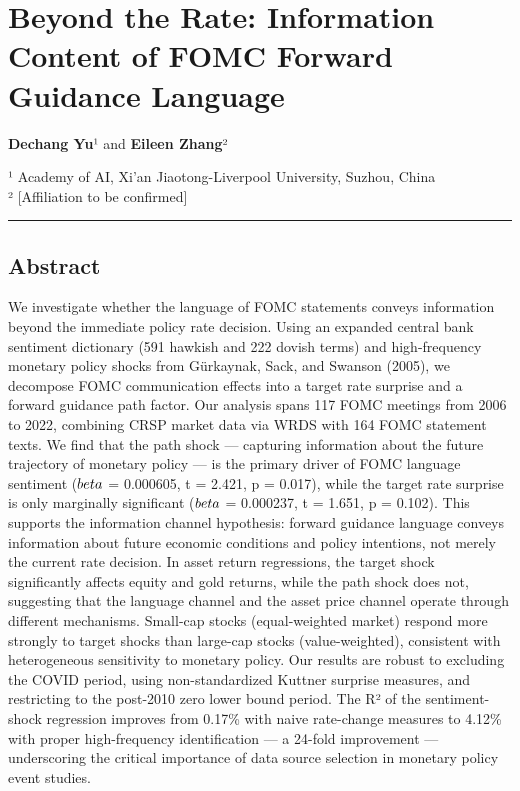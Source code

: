 \documentclass[12pt]{article}
\begin{document}
\section{Beyond the Rate: Information Content of FOMC Forward Guidance
Language}\label{beyond-the-rate-information-content-of-fomc-forward-guidance-language}

\textbf{Dechang Yu}¹ and \textbf{Eileen Zhang}²

¹ Academy of AI, Xi'an Jiaotong-Liverpool University, Suzhou, China\\
² {[}Affiliation to be confirmed{]}

\begin{center}\rule{0.5\linewidth}{0.5pt}\end{center}

\subsection{Abstract}\label{abstract}

We investigate whether the language of FOMC statements conveys
information beyond the immediate policy rate decision. Using an expanded
central bank sentiment dictionary (591 hawkish and 222 dovish terms) and
high-frequency monetary policy shocks from Gürkaynak, Sack, and Swanson
(2005), we decompose FOMC communication effects into a target rate
surprise and a forward guidance path factor. Our analysis spans 117 FOMC
meetings from 2006 to 2022, combining CRSP market data via WRDS with 164
FOMC statement texts. We find that the path shock --- capturing
information about the future trajectory of monetary policy --- is the
primary driver of FOMC language sentiment (\(\\beta\) = 0.000605, t =
2.421, p = 0.017), while the target rate surprise is only marginally
significant (\(\\beta\) = 0.000237, t = 1.651, p = 0.102). This supports
the information channel hypothesis: forward guidance language conveys
information about future economic conditions and policy intentions, not
merely the current rate decision. In asset return regressions, the
target shock significantly affects equity and gold returns, while the
path shock does not, suggesting that the language channel and the asset
price channel operate through different mechanisms. Small-cap stocks
(equal-weighted market) respond more strongly to target shocks than
large-cap stocks (value-weighted), consistent with heterogeneous
sensitivity to monetary policy. Our results are robust to excluding the
COVID period, using non-standardized Kuttner surprise measures, and
restricting to the post-2010 zero lower bound period. The R² of the
sentiment-shock regression improves from 0.17\% with naive rate-change
measures to 4.12\% with proper high-frequency identification --- a
24-fold improvement --- underscoring the critical importance of data
source selection in monetary policy event studies.
\end{document}
